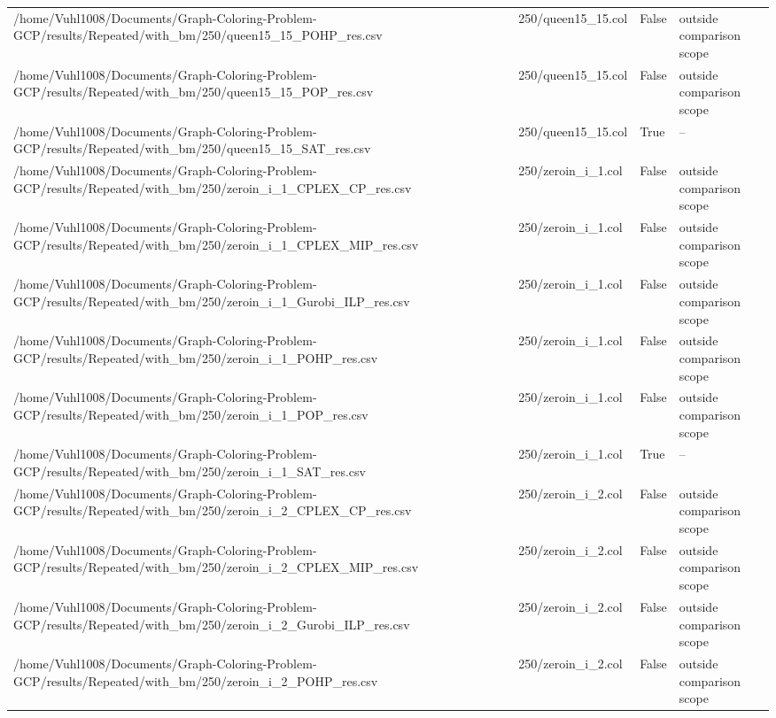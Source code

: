 \begin{table}[htbp]
\begin{tabular}{llll}
/home/Vuhl1008/Documents/Graph-Coloring-Problem-GCP/results/Repeated/with\_bm/250/queen15\_15\_POHP\_res.csv & 250/queen15\_15.col & False & outside comparison scope \\
/home/Vuhl1008/Documents/Graph-Coloring-Problem-GCP/results/Repeated/with\_bm/250/queen15\_15\_POP\_res.csv & 250/queen15\_15.col & False & outside comparison scope \\
/home/Vuhl1008/Documents/Graph-Coloring-Problem-GCP/results/Repeated/with\_bm/250/queen15\_15\_SAT\_res.csv & 250/queen15\_15.col & True & -- \\
/home/Vuhl1008/Documents/Graph-Coloring-Problem-GCP/results/Repeated/with\_bm/250/zeroin\_i\_1\_CPLEX\_CP\_res.csv & 250/zeroin\_i\_1.col & False & outside comparison scope \\
/home/Vuhl1008/Documents/Graph-Coloring-Problem-GCP/results/Repeated/with\_bm/250/zeroin\_i\_1\_CPLEX\_MIP\_res.csv & 250/zeroin\_i\_1.col & False & outside comparison scope \\
/home/Vuhl1008/Documents/Graph-Coloring-Problem-GCP/results/Repeated/with\_bm/250/zeroin\_i\_1\_Gurobi\_ILP\_res.csv & 250/zeroin\_i\_1.col & False & outside comparison scope \\
/home/Vuhl1008/Documents/Graph-Coloring-Problem-GCP/results/Repeated/with\_bm/250/zeroin\_i\_1\_POHP\_res.csv & 250/zeroin\_i\_1.col & False & outside comparison scope \\
/home/Vuhl1008/Documents/Graph-Coloring-Problem-GCP/results/Repeated/with\_bm/250/zeroin\_i\_1\_POP\_res.csv & 250/zeroin\_i\_1.col & False & outside comparison scope \\
/home/Vuhl1008/Documents/Graph-Coloring-Problem-GCP/results/Repeated/with\_bm/250/zeroin\_i\_1\_SAT\_res.csv & 250/zeroin\_i\_1.col & True & -- \\
/home/Vuhl1008/Documents/Graph-Coloring-Problem-GCP/results/Repeated/with\_bm/250/zeroin\_i\_2\_CPLEX\_CP\_res.csv & 250/zeroin\_i\_2.col & False & outside comparison scope \\
/home/Vuhl1008/Documents/Graph-Coloring-Problem-GCP/results/Repeated/with\_bm/250/zeroin\_i\_2\_CPLEX\_MIP\_res.csv & 250/zeroin\_i\_2.col & False & outside comparison scope \\
/home/Vuhl1008/Documents/Graph-Coloring-Problem-GCP/results/Repeated/with\_bm/250/zeroin\_i\_2\_Gurobi\_ILP\_res.csv & 250/zeroin\_i\_2.col & False & outside comparison scope \\
/home/Vuhl1008/Documents/Graph-Coloring-Problem-GCP/results/Repeated/with\_bm/250/zeroin\_i\_2\_POHP\_res.csv & 250/zeroin\_i\_2.col & False & outside comparison scope \\

\end{tabular}
\end{table}
